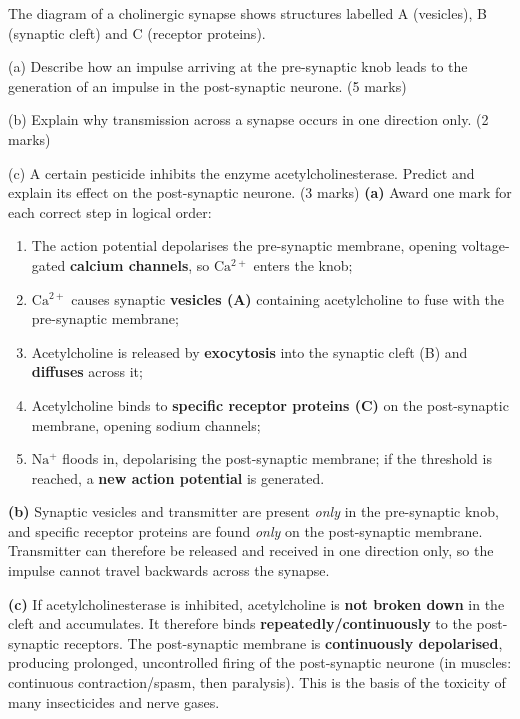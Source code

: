 \documentclass[11pt]{article}
\begin{document}
\begin{exoresolu}
The diagram of a cholinergic synapse shows structures labelled A (vesicles), B (synaptic cleft) and C (receptor proteins).\par
(a) Describe how an impulse arriving at the pre-synaptic knob leads to the generation of an impulse in the post-synaptic neurone. \hfill (5 marks)\par
(b) Explain why transmission across a synapse occurs in one direction only. \hfill (2 marks)\par
(c) A certain pesticide inhibits the enzyme acetylcholinesterase. Predict and explain its effect on the post-synaptic neurone. \hfill (3 marks)
\tcblower
\textbf{(a)} Award one mark for each correct step in logical order:
\begin{enumerate}
\item The action potential depolarises the pre-synaptic membrane, opening voltage-gated \textbf{calcium channels}, so $\mathrm{Ca^{2+}}$ enters the knob;
\item $\mathrm{Ca^{2+}}$ causes synaptic \textbf{vesicles (A)} containing acetylcholine to fuse with the pre-synaptic membrane;
\item Acetylcholine is released by \textbf{exocytosis} into the synaptic cleft (B) and \textbf{diffuses} across it;
\item Acetylcholine binds to \textbf{specific receptor proteins (C)} on the post-synaptic membrane, opening sodium channels;
\item $\mathrm{Na^{+}}$ floods in, depolarising the post-synaptic membrane; if the threshold is reached, a \textbf{new action potential} is generated.
\end{enumerate}
\textbf{(b)} Synaptic vesicles and transmitter are present \emph{only} in the pre-synaptic knob, and specific receptor proteins are found \emph{only} on the post-synaptic membrane. Transmitter can therefore be released and received in one direction only, so the impulse cannot travel backwards across the synapse.\par
\textbf{(c)} If acetylcholinesterase is inhibited, acetylcholine is \textbf{not broken down} in the cleft and accumulates. It therefore binds \textbf{repeatedly/continuously} to the post-synaptic receptors. The post-synaptic membrane is \textbf{continuously depolarised}, producing prolonged, uncontrolled firing of the post-synaptic neurone (in muscles: continuous contraction/spasm, then paralysis). This is the basis of the toxicity of many insecticides and nerve gases.
\end{exoresolu}
\end{document}

